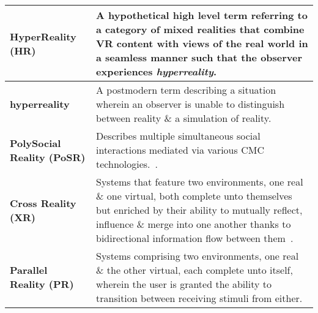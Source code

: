 \begin{center}
\begin{longtable}{| l | p{10cm} |}

\hline	
	
		
\textbf{HyperReality (HR)} & A hypothetical high level term referring to a category of mixed realities that combine VR content with views of the real world in a seamless manner such that the observer experiences \textit{hyperreality}. \\
		
\hline
		

\textbf{hyperreality} & A postmodern term describing a situation wherein an observer is unable to distinguish between reality \& a simulation of reality. \\

\hline

		
\textbf{PolySocial Reality (PoSR)} & Describes multiple simultaneous social interactions mediated via various CMC technologies.~\cite{Applin2012}. \\

\hline


\textbf{Cross Reality (XR)} & Systems that feature two environments, one real \& one virtual, both complete unto themselves~\cite{lifton:merging} but enriched by their ability to mutually reflect, influence \& merge into one another thanks to bidirectional information flow between them~\cite{kim:practical}. \\

\hline


\textbf{Parallel Reality (PR)} & Systems comprising two environments, one real \& the other virtual, each complete unto itself, wherein the user is granted the ability to transition between receiving stimuli from either. \\

\hline


\end{longtable}
\end{center}

